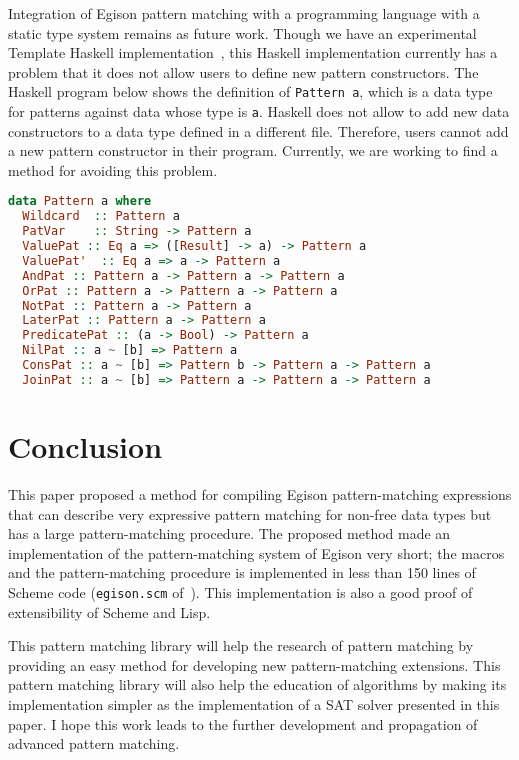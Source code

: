 \documentclass[acmlarge]{acmart}
\begin{document}
Integration of Egison pattern matching with a programming language with a static type system remains as future work.
Though we have an experimental Template Haskell implementation~\cite{egisonHaskell}, this Haskell implementation currently has a problem that it does not allow users to define new pattern constructors.
The Haskell program below shows the definition of \texttt{Pattern a}, which is a data type for patterns against data whose type is \texttt{a}.
Haskell does not allow to add new data constructors to a data type defined in a different file.
Therefore, users cannot add a new pattern constructor in their program.
Currently, we are working to find a method for avoiding this problem.

\begin{lstlisting}[language=haskell]
data Pattern a where
  Wildcard  :: Pattern a
  PatVar    :: String -> Pattern a
  ValuePat :: Eq a => ([Result] -> a) -> Pattern a
  ValuePat'  :: Eq a => a -> Pattern a
  AndPat :: Pattern a -> Pattern a -> Pattern a
  OrPat :: Pattern a -> Pattern a -> Pattern a
  NotPat :: Pattern a -> Pattern a
  LaterPat :: Pattern a -> Pattern a
  PredicatePat :: (a -> Bool) -> Pattern a
  NilPat :: a ~ [b] => Pattern a
  ConsPat :: a ~ [b] => Pattern b -> Pattern a -> Pattern a
  JoinPat :: a ~ [b] => Pattern a -> Pattern a -> Pattern a
\end{lstlisting}

\section{Conclusion}\label{conclusion}

This paper proposed a method for compiling Egison pattern-matching expressions that can describe very expressive pattern matching for non-free data types but has a large pattern-matching procedure.
The proposed method made an implementation of the pattern-matching system of Egison very short; the macros and the pattern-matching procedure is implemented in less than 150 lines of Scheme code (\texttt{egison.scm} of~\cite{egisonScheme}).
This implementation is also a good proof of extensibility of Scheme and Lisp.

This pattern matching library will help the research of pattern matching by providing an easy method for developing new pattern-matching extensions.
This pattern matching library will also help the education of algorithms by making its implementation simpler as the implementation of a SAT solver presented in this paper.
I hope this work leads to the further development and propagation of advanced pattern matching.




\end{document}
